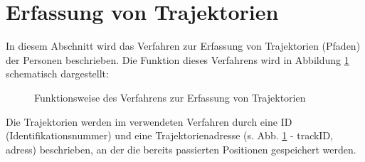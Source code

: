 
\section{Erfassung von Trajektorien}
\label{sec:trajektorien}

In diesem Abschnitt wird das Verfahren zur Erfassung von Trajektorien (Pfaden) der Personen beschrieben. Die Funktion dieses Verfahrens wird in Abbildung \ref{idMaps} schematisch dargestellt:
\bigskip
\begin{figure}[h]
  \centering
  \caption{Funktionsweise des Verfahrens zur Erfassung von Trajektorien}
  \label{idMaps}
\end{figure}

Die Trajektorien werden im verwendeten Verfahren durch eine ID (Identifikationsnummer) und eine Trajektorienadresse (s. Abb. \ref{idMaps} - trackID, adress) beschrieben, an der die bereits passierten Positionen gespeichert werden.

